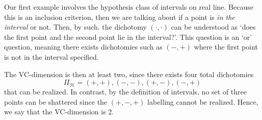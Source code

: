 \begin{example}
    Our first example involves the hypothesis class of intervals on real line. Because this is an inclusion criterion, then we are talking about if a point is \textit{in the interval} or not. Then, by such. the dichotomy $(\cdot,\cdot)$ can be understood as `does the first point and the second point lie in the interval?'. This question is an `or' question, meaning there exists dichotomies such as $(-,+)$ where the first point is not in the interval specified. 
    
    The VC-dimension is then at least two, since there exists four total dichotomies $$\Pi_{\mathcal{H}}=(+,+),(-,-),(+,-),(-,+)$$ that can be realized. In contrast, by the definition of intervals, no set of three points can be shattered since the $(+,-,+)$ labelling cannot be realized. Hence, we say that the VC-dimension is 2. 
\end{example}

